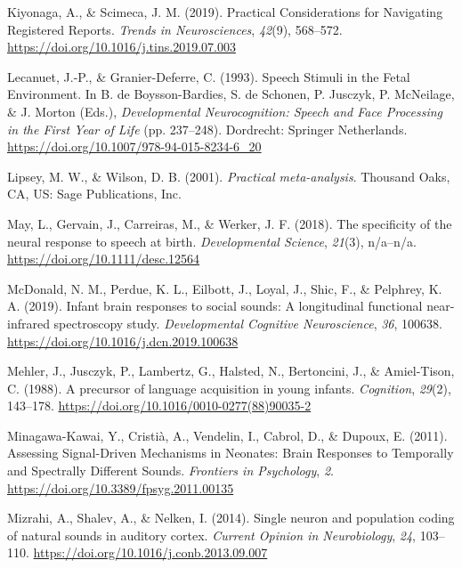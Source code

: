 \documentclass[man]{apa6}
\begin{document}
\leavevmode\hypertarget{ref-kiyonaga_practical_2019}{}%
Kiyonaga, A., \& Scimeca, J. M. (2019). Practical Considerations for Navigating Registered Reports. \emph{Trends in Neurosciences}, \emph{42}(9), 568--572. \url{https://doi.org/10.1016/j.tins.2019.07.003}

\leavevmode\hypertarget{ref-lecanuet_speech_1993}{}%
Lecanuet, J.-P., \& Granier-Deferre, C. (1993). Speech Stimuli in the Fetal Environment. In B. de Boysson-Bardies, S. de Schonen, P. Jusczyk, P. McNeilage, \& J. Morton (Eds.), \emph{Developmental Neurocognition: Speech and Face Processing in the First Year of Life} (pp. 237--248). Dordrecht: Springer Netherlands. \url{https://doi.org/10.1007/978-94-015-8234-6_20}

\leavevmode\hypertarget{ref-lipsey_practical_2001}{}%
Lipsey, M. W., \& Wilson, D. B. (2001). \emph{Practical meta-analysis}. Thousand Oaks, CA, US: Sage Publications, Inc.

\leavevmode\hypertarget{ref-may_specificity_2018}{}%
May, L., Gervain, J., Carreiras, M., \& Werker, J. F. (2018). The specificity of the neural response to speech at birth. \emph{Developmental Science}, \emph{21}(3), n/a--n/a. \url{https://doi.org/10.1111/desc.12564}

\leavevmode\hypertarget{ref-mcdonald_infant_2019}{}%
McDonald, N. M., Perdue, K. L., Eilbott, J., Loyal, J., Shic, F., \& Pelphrey, K. A. (2019). Infant brain responses to social sounds: A longitudinal functional near-infrared spectroscopy study. \emph{Developmental Cognitive Neuroscience}, \emph{36}, 100638. \url{https://doi.org/10.1016/j.dcn.2019.100638}

\leavevmode\hypertarget{ref-mehler_precursor_1988}{}%
Mehler, J., Jusczyk, P., Lambertz, G., Halsted, N., Bertoncini, J., \& Amiel-Tison, C. (1988). A precursor of language acquisition in young infants. \emph{Cognition}, \emph{29}(2), 143--178. \url{https://doi.org/10.1016/0010-0277(88)90035-2}

\leavevmode\hypertarget{ref-minagawa-kawai_assessing_2011}{}%
Minagawa-Kawai, Y., Cristià, A., Vendelin, I., Cabrol, D., \& Dupoux, E. (2011). Assessing Signal-Driven Mechanisms in Neonates: Brain Responses to Temporally and Spectrally Different Sounds. \emph{Frontiers in Psychology}, \emph{2}. \url{https://doi.org/10.3389/fpsyg.2011.00135}

\leavevmode\hypertarget{ref-mizrahi_single_2014}{}%
Mizrahi, A., Shalev, A., \& Nelken, I. (2014). Single neuron and population coding of natural sounds in auditory cortex. \emph{Current Opinion in Neurobiology}, \emph{24}, 103--110. \url{https://doi.org/10.1016/j.conb.2013.09.007}
\end{document}
